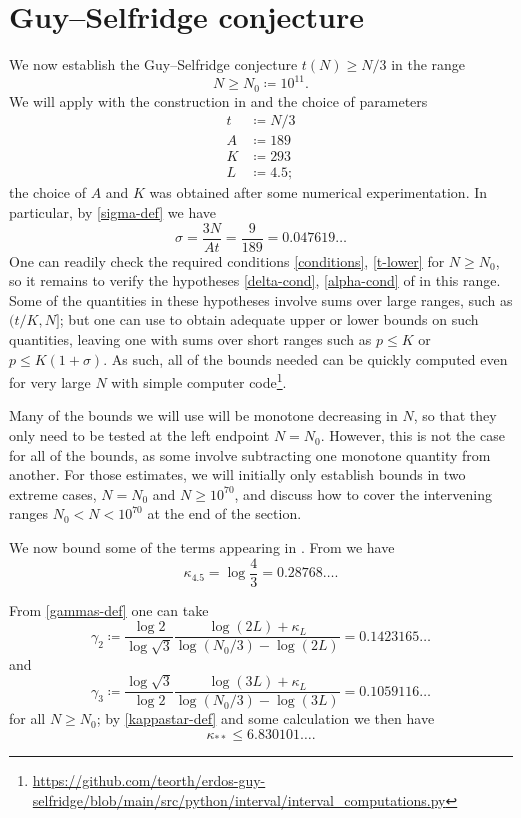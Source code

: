 \documentclass[12pt,a4paper,reqno]{amsart}
\numberwithin{equation}{section}
\theoremstyle{plain}
\theoremstyle{definition}
\begin{document}
\section{Guy--Selfridge conjecture} \label{10^{11}}

We now establish the Guy--Selfridge conjecture $t(N) \geq N/3$ in the range
$$ N \geq N_0 \coloneqq 10^{11}.$$
We will apply  with the construction in  and the choice of parameters
\begin{align*}
  t &\coloneqq N/3\\
  A &\coloneqq 189\\
  K &\coloneqq 293 \\
  L &\coloneqq 4.5;
\end{align*}
the choice of $A$ and $K$ was obtained after some numerical experimentation.  In particular, by \eqref{sigma-def} we have
$$ \sigma = \frac{3N}{At}=\frac{9}{189} =0.047619\dots$$
One can readily check the required conditions \eqref{conditions}, \eqref{t-lower} for $N \geq N_0$, so it remains to verify the hypotheses \eqref{delta-cond}, \eqref{alpha-cond} of  in this range.  Some of the quantities in these hypotheses involve sums over large ranges, such as $(t/K,N]$; but one can use  to obtain adequate upper or lower bounds on such quantities, leaving one with sums over short ranges such as $p \leq K$ or $p \leq K(1+\sigma)$.  As such, all of the bounds needed can be quickly computed even for very large $N$ with simple computer code\footnote{\url{https://github.com/teorth/erdos-guy-selfridge/blob/main/src/python/interval/interval_computations.py}}.

Many of the bounds we will use will be monotone decreasing in $N$, so that they only need to be tested at the left endpoint $N=N_0$.  However, this is not the case for all of the bounds, as some involve subtracting one monotone quantity from another.  For those estimates, we will initially only establish bounds in two extreme cases, $N=N_0$ and $N \geq 10^{70}$, and discuss how to cover the intervening ranges $N_0 < N < 10^{70}$ at the end of the section.
  
We now bound some of the terms appearing in . From  we have
$$ \kappa_{4.5} = \log \frac{4}{3} =0.28768\dots.$$

From \eqref{gammas-def} one can take
$$ \gamma_2 \coloneqq \frac{\log 2}{\log \sqrt{3}} \frac{\log(2L) + \kappa_L}{\log(N_0/3) - \log(2L)} = 0.1423165\dots$$
and
$$\gamma_3 \coloneqq \frac{\log \sqrt{3}}{\log 2} \frac{\log(3L) + \kappa_L}{\log(N_0/3) - \log(3L)} =  0.1059116 \dots$$
for all $N \geq N_0$; by \eqref{kappastar-def} and some calculation we then have
$$ \kappa_{**} \leq 6.830101\dots.$$
\end{document}
